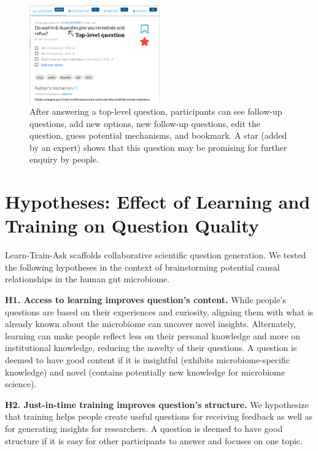 \begin{figure}
  \centering
  \includegraphics[width=0.5\textwidth]{figures/docent/fig-4.png}
  \caption[Participants can see follow-up questions, add new options, new follow-up questions, edit the question, guess potential mechanisms, and bookmark]
{After answering a top-level question, participants can see follow-up questions, add new options, new follow-up questions, edit the question, guess potential mechanisms, and bookmark. A star (added by an expert) shows that this question may be promising for further enquiry by people.}
  \label{fig:docent-4}
\end{figure}

\section{Hypotheses: Effect of Learning and Training on Question Quality}
Learn-Train-Ask scaffolds collaborative scientific question generation. We tested the following hypotheses in the context of brainstorming potential causal relationships in the human gut microbiome.

\textbf{H1. Access to learning improves question’s content.}
While people’s questions are based on their experiences and curiosity, aligning them with what is already known about the microbiome can uncover novel insights. Alternately, learning can make people reflect less on their personal knowledge and more on institutional knowledge, reducing the novelty of their questions. A question is deemed to have good content if it is insightful (exhibits microbiome-specific knowledge) and novel (contains potentially new knowledge for microbiome science).

\textbf{H2. Just-in-time training improves question’s structure.}
We hypothesize that training helps people create useful questions for receiving feedback as well as for generating insights for researchers. A question is deemed to have good structure if it is easy for other participants to answer and focuses on one topic.

